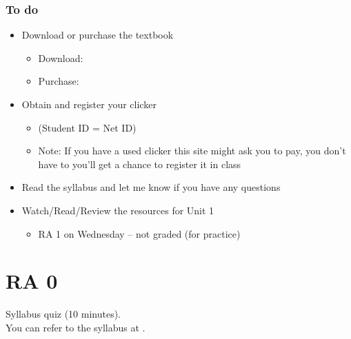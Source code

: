 \documentclass[11pt,containsverbatim,handout,xcolor=xelatex,dvipsnames,table]{beamer}
\begin{document}
\begin{frame}
\frametitle{To do}

\begin{itemize}

\item Download or purchase the textbook
\begin{itemize}
\item Download: 
\item Purchase: 
\end{itemize}

\item Obtain and register your clicker
\begin{itemize}
\item {} (Student ID = Net ID) 
\item Note: If you have a used clicker this site might ask you to pay, you don't have to
you'll get a chance to register it in class
\end{itemize}

\item Read the syllabus and let me know if you have any questions

\item Watch/Read/Review the resources for Unit 1
\begin{itemize}
\item RA 1 on Wednesday -- not graded (for practice)
\end{itemize}

\end{itemize}

\end{frame}


\section{RA 0}


\begin{frame}

\vfill

Syllabus quiz (10 minutes). \\

You can refer to the syllabus at \webURL{\CourseSite}.

\vfill

\end{frame}

\end{document}
